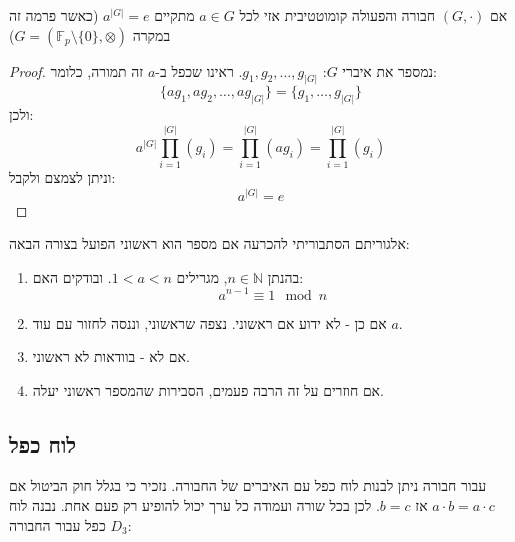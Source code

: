 \documentclass{tstextbook}
\begin{document}
\begin{theorem}
אם \((G,\cdot)\) חבורה והפעולה קומוטטיבית אזי לכל \(a\in G\) מתקיים \(a^{|G|}=e\) (כאשר פרמה זה במקרה \(G=(\mathbb{F}_{p}\setminus \{ 0 \},\otimes)\))

\end{theorem}
\begin{proof}
נמספר את איברי \(G\): \(g_{1},g_{2},\dots,g_{|G|}\). 
ראינו שכפל ב-\(a\) זה תמורה, כלומר:
$$\{ ag_{1},ag_{2},\dots,ag_{|G|} \}=\{ g_{1},\dots,g_{|G|} \}$$
ולכן:
$$a^{|G|}\prod_{i=1}^{|G|}(g_{i})=\prod_{i=1}^{|G|}(ag_{i})=\prod_{i=1}^{|G|}(g_{i})$$
וניתן לצמצם ולקבל:
$$a^{|G|}=e$$

\end{proof}
\begin{proposition}
אלגוריתם הסתבוריתי להכרעה אם מספר הוא ראשוני הפועל בצורה הבאה:

  \begin{enumerate}
    \item בהנתן \(n\in \mathbb{N}\), מגרילים \(1<a<n\). ובודקים האם: 
$$a^{n-1} \equiv 1\mod n$$


    \item אם כן - לא ידוע אם ראשוני. נצפה שראשוני, וננסה לחזור עם עוד \(a\). 


    \item אם לא - בוודאות לא ראשוני. 


    \item אם חוזרים על זה הרבה פעמים, הסבירות שהמספר ראשוני יעלה.  


  \end{enumerate}
\end{proposition}
\subsection{לוח כפל}

עבור חבורה ניתן לבנות לוח כפל עם האיברים של החבורה. נזכיר כי בגלל חוק הביטול אם \(a\cdot b=a\cdot c\) אז \(b=c\). לכן בכל שורה ועמודה כל ערך יכול להופיע רק פעם אחת. נבנה לוח כפל עבור החבורה \(D_{3}\):
\end{document}

